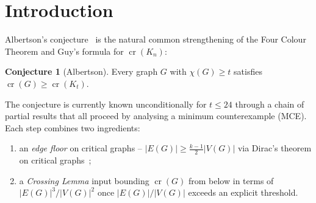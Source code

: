 \documentclass[11pt,a4paper]{article}
\theoremstyle{definition}
\newtheorem{conjecture}[theorem]{Conjecture}
\DeclareMathOperator{\crN}{cr}
\begin{document}
\begin{abstract}
We record two observations arising from an analysis of the
structural slacks in the chain of partial results towards
Albertson's conjecture. \textbf{First}, the
Albertson--Cranston--Fox~/ Bar\'at--T\'oth~/ Ackerman chain
establishing the conjecture unconditionally at chromatic number up
to $t = 18$ depends on its $\chi$-hypothesis only through the Dirac
minimum-degree bound, which lifts verbatim to list-coloring via the
list versions of Dirac's and Brooks' theorems (Borodin~1977;
Erd\H{o}s--Rubin--Taylor~1979). Assembling these observations gives
list-Albertson at $t \le 18$, strictly stronger than ordinary
Albertson at the same range. \textbf{Second}, the
Pach--Spencer--T\'oth bisection-width Crossing Lemma, combined with
Alon's spectral bisection lower bound, yields an explicit-$\theta$
Crossing Lemma for $d_0$-regular spectral $\theta$-expanders,
\[
   \crN(G) \;\ge\; \frac{(1 - \theta)^{2}\,d_0^{2}\,n^{2}}{1280}
                 \;-\; \frac{d_0^{2}\,n}{16},
\]
with an Albertson-type corollary on regular spectral-expander
critical graphs. We are not aware of an earlier Crossing-Lemma
inequality with explicit spectral dependence. Neither observation
closes the Cranston residual at $t \in \{25, 26\}$; both are
recorded as side-observations in the structural neighbourhood of
the conjecture.
\end{abstract}

\section{Introduction}\label{sec:intro}

Albertson's conjecture~\cite{Albertson} is the natural common
strengthening of the Four Colour Theorem and Guy's formula for
$\crN(K_n)$:

\begin{conjecture}[Albertson]\label{conj:albertson}
Every graph $G$ with $\chi(G) \ge t$ satisfies
$\crN(G) \ge \crN(K_t)$.
\end{conjecture}

The conjecture is currently known unconditionally for $t \le 24$
through a chain of partial results that all proceed by analysing a
minimum counterexample (MCE). Each step combines two ingredients:

\begin{enumerate}
  \item an \emph{edge floor} on critical graphs --
        $|E(G)| \ge \tfrac{k-1}{2}|V(G)|$ via Dirac's theorem on
        critical graphs~\cite{Dirac1952};
  \item a \emph{Crossing Lemma} input bounding $\crN(G)$ from below
        in terms of $|E(G)|^{3}/|V(G)|^{2}$ once $|E(G)| / |V(G)|$
        exceeds an explicit threshold.
\end{enumerate}
\end{document}
